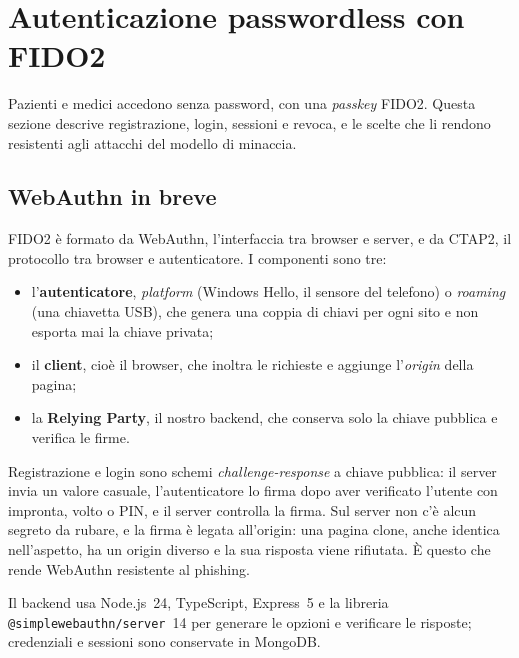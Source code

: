 \section{Autenticazione passwordless con FIDO2}\label{sec:fido2}

Pazienti e medici accedono senza password, con una \emph{passkey} FIDO2. Questa sezione descrive registrazione, login, sessioni e revoca, e le scelte che li rendono resistenti agli attacchi del modello di minaccia.

\subsection{WebAuthn in breve}
FIDO2 è formato da WebAuthn\cite{webauthn}, l'interfaccia tra browser e server, e da CTAP2, il protocollo tra browser e autenticatore. I componenti sono tre:
\begin{itemize}
  \item l'\textbf{autenticatore}, \emph{platform} (Windows Hello, il sensore del telefono) o \emph{roaming} (una chiavetta USB), che genera una coppia di chiavi per ogni sito e non esporta mai la chiave privata;
  \item il \textbf{client}, cioè il browser, che inoltra le richieste e aggiunge l'\emph{origin} della pagina;
  \item la \textbf{Relying Party}, il nostro backend, che conserva solo la chiave pubblica e verifica le firme.
\end{itemize}
Registrazione e login sono schemi \emph{challenge-response} a chiave pubblica\cite{kaufman}: il server invia un valore casuale, l'autenticatore lo firma dopo aver verificato l'utente con impronta, volto o PIN, e il server controlla la firma. Sul server non c'è alcun segreto da rubare, e la firma è legata all'origin: una pagina clone, anche identica nell'aspetto, ha un origin diverso e la sua risposta viene rifiutata. È questo che rende WebAuthn resistente al phishing.

Il backend usa Node.js~24, TypeScript, Express~5 e la libreria \texttt{@simplewebauthn/server}~14 per generare le opzioni e verificare le risposte; credenziali e sessioni sono conservate in MongoDB.


